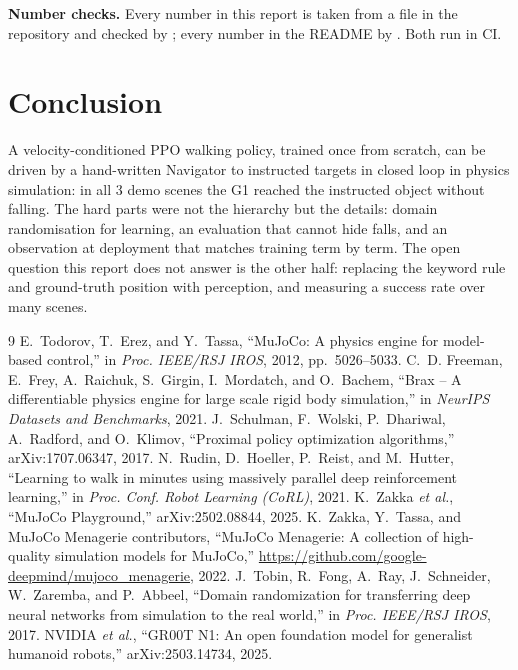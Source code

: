 \documentclass[conference,10pt]{IEEEtran}
\begin{document}
\textbf{Number checks.} Every number in this report is taken from a file in the repository and checked by
; every number in the README by . Both run in CI.

\section{Conclusion}\label{sec:conclusion}
A velocity-conditioned PPO walking policy, trained once from scratch, can be driven by a hand-written Navigator to
instructed targets in closed loop in physics simulation: in all 3 demo scenes the G1 reached the instructed object
without falling. The hard parts were not the hierarchy but the details: domain randomisation for learning, an evaluation
that cannot hide falls, and an observation at deployment that matches training term by term. The open question this
report does not answer is the other half: replacing the keyword rule and ground-truth position with perception, and
measuring a success rate over many scenes.

\begin{thebibliography}{9}
 E.~Todorov, T.~Erez, and Y.~Tassa, ``MuJoCo: A physics engine for model-based control,'' in
  \emph{Proc. IEEE/RSJ IROS}, 2012, pp.~5026--5033.
 C.~D. Freeman, E.~Frey, A.~Raichuk, S.~Girgin, I.~Mordatch, and O.~Bachem, ``Brax -- A
  differentiable physics engine for large scale rigid body simulation,'' in \emph{NeurIPS Datasets and Benchmarks}, 2021.
 J.~Schulman, F.~Wolski, P.~Dhariwal, A.~Radford, and O.~Klimov, ``Proximal policy optimization
  algorithms,'' arXiv:1707.06347, 2017.
 N.~Rudin, D.~Hoeller, P.~Reist, and M.~Hutter, ``Learning to walk in minutes using massively
  parallel deep reinforcement learning,'' in \emph{Proc. Conf. Robot Learning (CoRL)}, 2021.
 K.~Zakka \emph{et al.}, ``MuJoCo Playground,'' arXiv:2502.08844, 2025.
 K.~Zakka, Y.~Tassa, and MuJoCo Menagerie contributors, ``MuJoCo Menagerie: A collection of
  high-quality simulation models for MuJoCo,'' \url{https://github.com/google-deepmind/mujoco_menagerie}, 2022.
 J.~Tobin, R.~Fong, A.~Ray, J.~Schneider, W.~Zaremba, and P.~Abbeel, ``Domain randomization for
  transferring deep neural networks from simulation to the real world,'' in \emph{Proc. IEEE/RSJ IROS}, 2017.
 NVIDIA \emph{et al.}, ``GR00T N1: An open foundation model for generalist humanoid robots,''
  arXiv:2503.14734, 2025.
\end{thebibliography}
\end{document}
